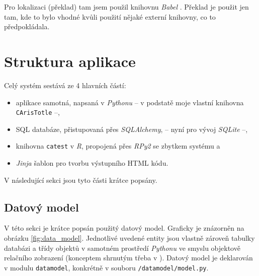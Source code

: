 \documentclass[a4paper,twoside,12pt]{scrbook}
\begin{document}
Pro lokalizaci (překlad) tam jsem použil knihovnu \textit{Babel} \cite{babel}. Překlad je použit jen tam, kde to bylo vhodné kvůli použití nějaké externí knihovny, co to předpokládala.

\section{Struktura aplikace}
Celý systém sestává ze 4 hlavních částí:
\begin{itemize}
	\item aplikace samotná, napsaná v \textit{Pythonu} -- v podstatě moje vlastní knihovna \texttt{CArisTotle} --,
	\item SQL databáze, přistupovaná přes \textit{SQLAlchemy}, -- nyní pro vývoj \textit{SQLite} --,
	\item knihovna \texttt{catest} v \textit{R}, propojená přes \textit{RPy2} se zbytkem systému a
	\item \textit{Jinja} šablon pro tvorbu výstupního HTML kódu.
\end{itemize}
V následující sekci jsou tyto části krátce popsány.

\subsection{Datový model}
V této sekci je krátce popsán použitý datový model. Graficky je znázorněn na obrázku \ref{fig:data_model}. Jednotlivé uvedené entity jsou vlastně zároveň tabulky databázi a třídy objektů v samotném prostředí \textit{Pythonu} ve smyslu objektově relačního zobrazení (konceptem shrnutým třeba v \cite{ORM}). Datový model je deklarován v modulu \texttt{datamodel}, konkrétně v souboru \texttt{/datamodel/model.py}.
\end{document}
